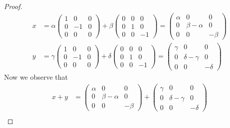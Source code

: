 \documentclass[12pt]{article}
\theoremstyle{definition}
\begin{document}
\begin{enumerate}
\begin{enumerate}[label=(\alph*)]
\begin{proof}
                        \begin{equation*}
                            \begin{split}
                                x &=
                                \alpha\begin{pmatrix}1&0&0\\0&-1&0\\0&0&0\end{pmatrix}+\beta
                                \begin{pmatrix}0&0&0\\0&1&0\\0&0&-1\end{pmatrix}=
                                \begin{pmatrix}\alpha&0&0\\0&\beta-\alpha&0\\0&0&-\beta\end{pmatrix}
                                \\
                                y&=\gamma\begin{pmatrix}1&0&0\\0&-1&0\\0&0&0\end{pmatrix}+\delta
                                \begin{pmatrix}0&0&0\\0&1&0\\0&0&-1\end{pmatrix}=
                                \begin{pmatrix}\gamma&0&0\\0&\delta-\gamma&0\\0&0&-\delta\end{pmatrix}
                            \end{split}
                        \end{equation*}
                        Now we observe that 
                        \begin{equation*}
                            \begin{split}
                                x+y&=\begin{pmatrix}\alpha&0&0\\0&\beta-\alpha&0\\0&0&-\beta\end{pmatrix}
                                +\begin{pmatrix}\gamma&0&0\\0&\delta-\gamma&0\\0&0&-\delta\end{pmatrix}\\

\end{split}
\end{equation*}
\end{proof}
\end{enumerate}
\end{enumerate}
\end{document}
